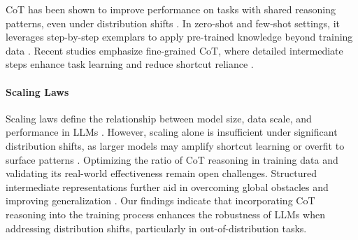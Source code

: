 CoT has been shown to improve performance on tasks with shared reasoning patterns, even under distribution shifts \cite{li2024how,hu2024unveilingstatisticalfoundationschainofthought}. In zero-shot and few-shot settings, it leverages step-by-step exemplars to apply pre-trained knowledge beyond training data \cite{kim2023cot}. Recent studies emphasize fine-grained CoT, where detailed intermediate steps enhance task learning and reduce shortcut reliance \cite{nguyen2023cof,chu-etal-2025-towards}.
\vspace{-\baselineskip}
\paragraph{Scaling Laws}
Scaling laws define the relationship between model size, data scale, and performance in LLMs \cite{kaplan2020scalinglawsneurallanguage,hoffmann2022trainingcomputeoptimallargelanguage,chowdhery2022palm}. However, scaling alone is insufficient under significant distribution shifts, as larger models may amplify shortcut learning or overfit to surface patterns \cite{micelibarone2022distributionallyrobustrecurrentdecoders}.
Optimizing the ratio of CoT reasoning in training data and validating its real-world effectiveness remain open challenges. Structured intermediate representations further aid in overcoming global obstacles and improving generalization \cite{abbe2024fartransformersreasonglobality}. Our findings indicate that incorporating CoT reasoning into the training process enhances the robustness of LLMs when addressing distribution shifts, particularly in out-of-distribution tasks. 

